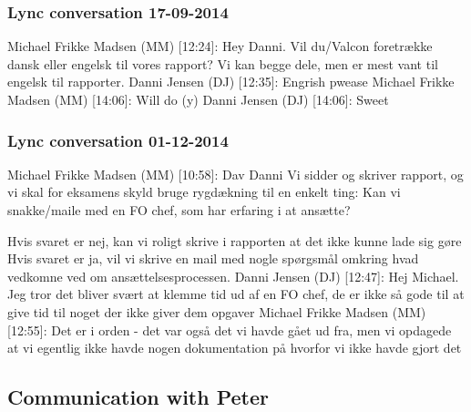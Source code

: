 \subsubsection{Lync conversation 17-09-2014}
Michael Frikke Madsen (MM) [12:24]: 
Hey Danni. Vil du/Valcon foretrække dansk eller engelsk til vores rapport?
Vi kan begge dele, men er mest vant til engelsk til rapporter. \newline
Danni Jensen (DJ) [12:35]: 
Engrish pwease \newline
Michael Frikke Madsen (MM) [14:06]: 
Will do (y) \newline
Danni Jensen (DJ) [14:06]: 
Sweet

\subsubsection{Lync conversation 01-12-2014}
Michael Frikke Madsen (MM) [10:58]: 
Dav Danni
Vi sidder og skriver rapport, og vi skal for eksamens skyld bruge rygdækning til en enkelt ting:
Kan vi snakke/maile med en FO chef, som har erfaring i at ansætte?

Hvis svaret er nej, kan vi roligt skrive i rapporten at det ikke kunne lade sig gøre
Hvis svaret er ja, vil vi skrive en mail med nogle spørgsmål omkring hvad vedkomne ved om ansættelsesprocessen. \newline
Danni Jensen (DJ) [12:47]: 
Hej Michael. Jeg tror det bliver svært at klemme tid ud af en FO chef, de er ikke så gode til at give tid til noget der ikke giver dem opgaver \newline
{}
Michael Frikke Madsen (MM) [12:55]: 
Det er i orden - det var også det vi havde gået ud fra, men vi opdagede at vi egentlig ikke havde nogen dokumentation på hvorfor vi ikke havde gjort det \newline


\subsection{Communication with Peter}

